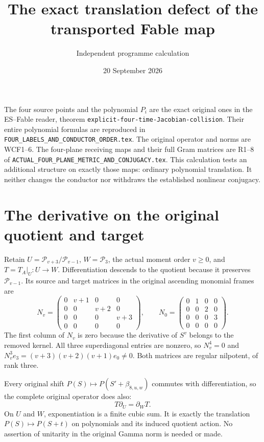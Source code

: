 \documentclass[11pt]{article}
\title{The exact translation defect of the transported Fable map}
\author{Independent programme calculation}
\date{20 September 2026}
\newcommand{\cP}{\mathcal P}
\begin{document}
\maketitle

The four source points and the polynomial $P_i$ are the exact original
ones in the ES--Fable reader, theorem
\texttt{explicit-four-time-Jacobian-collision}. Their entire polynomial
formulas are reproduced in
\texttt{FOUR\_LABELS\_AND\_CONDUCTOR\_ORDER.tex}. The original
operator and norms are WCF1--6. The four-plane receiving maps and
their full Gram matrices are R1--8 of
\texttt{ACTUAL\_FOUR\_PLANE\_METRIC\_AND\_CONJUGACY.tex}.
This calculation tests an additional structure on exactly those maps:
ordinary polynomial translation. It neither changes the conductor
nor withdraws the established nonlinear conjugacy.

\section{The derivative on the original quotient and target}
Retain $U=\cP_{v+3}/\cP_{v-1}$, $W=\cP_3$, the actual moment
order $v\ge0$, and $T=T_A|_U:U\to W$. Differentiation descends
to the quotient because it preserves $\cP_{v-1}$. Its source
and target matrices in the original ascending monomial frames are
\begin{equation}
 N_v=\begin{pmatrix}0&v+1&0&0\\0&0&v+2&0\\0&0&0&v+3\\0&0&0&0\end{pmatrix},
 \qquad
 N_0=\begin{pmatrix}0&1&0&0\\0&0&2&0\\0&0&0&3\\0&0&0&0\end{pmatrix}.
 \tag{TD1}
\end{equation}
The first column of $N_v$ is zero because the derivative of $S^v$
belongs to the removed kernel. All three superdiagonal entries are
nonzero, so $N_v^4=0$ and
$N_v^3e_3=(v+3)(v+2)(v+1)e_0\ne0$. Both matrices are regular
nilpotent, of rank three.

Every original shift $P(S)\mapsto P(S'+\beta_{8,u,w})$ commutes
with differentiation, so the complete original operator does also:
\begin{equation}
 T\partial_U=\partial_W T.\tag{TD2}
\end{equation}
On $U$ and $W$, exponentiation is a finite cubic sum. It is exactly
the translation $P(S)\mapsto P(S+t)$ on polynomials and its induced
quotient action. No assertion of unitarity in the original Gamma
norm is needed or made.
\end{document}
